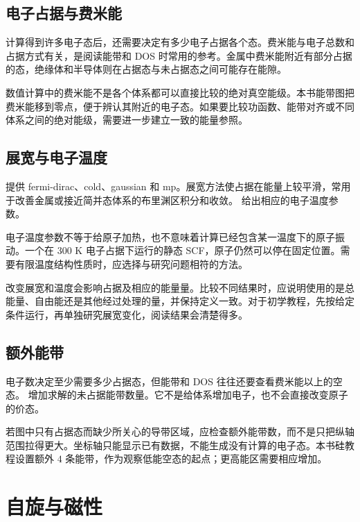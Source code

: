 \subsection{电子占据与费米能}

计算得到许多电子态后，还需要决定有多少电子占据各个态。费米能与电子总数和占据方式有关，是阅读能带和 DOS 时常用的参考。金属中费米能附近有部分占据的态，绝缘体和半导体则在占据态与未占据态之间可能存在能隙。

数值计算中的费米能不是各个体系都可以直接比较的绝对真空能级。本书能带图把费米能移到零点，便于辨认其附近的电子态。如果要比较功函数、能带对齐或不同体系之间的绝对能级，需要进一步建立一致的能量参照。

\subsection{展宽与电子温度}

 提供 fermi-dirac、cold、gaussian 和 mp。展宽方法使占据在能量上较平滑，常用于改善金属或接近简并态体系的布里渊区积分和收敛。 给出相应的电子温度参数。

电子温度参数不等于给原子加热，也不意味着计算已经包含某一温度下的原子振动。一个在 $300$ K 电子占据下运行的静态 SCF，原子仍然可以停在固定位置。需要有限温度结构性质时，应选择与研究问题相符的方法。

改变展宽和温度会影响占据及相应的能量量。比较不同结果时，应说明使用的是总能量、自由能还是其他经过处理的量，并保持定义一致。对于初学教程，先按给定条件运行，再单独研究展宽变化，阅读结果会清楚得多。

\subsection{额外能带}

电子数决定至少需要多少占据态，但能带和 DOS 往往还要查看费米能以上的空态。 增加求解的未占据能带数量。它不是给体系增加电子，也不会直接改变原子的价态。

若图中只有占据态而缺少所关心的导带区域，应检查额外能带数，而不是只把纵轴范围拉得更大。坐标轴只能显示已有数据，不能生成没有计算的电子态。本书硅教程设置额外 $4$ 条能带，作为观察低能空态的起点；更高能区需要相应增加。

\section{自旋与磁性}

